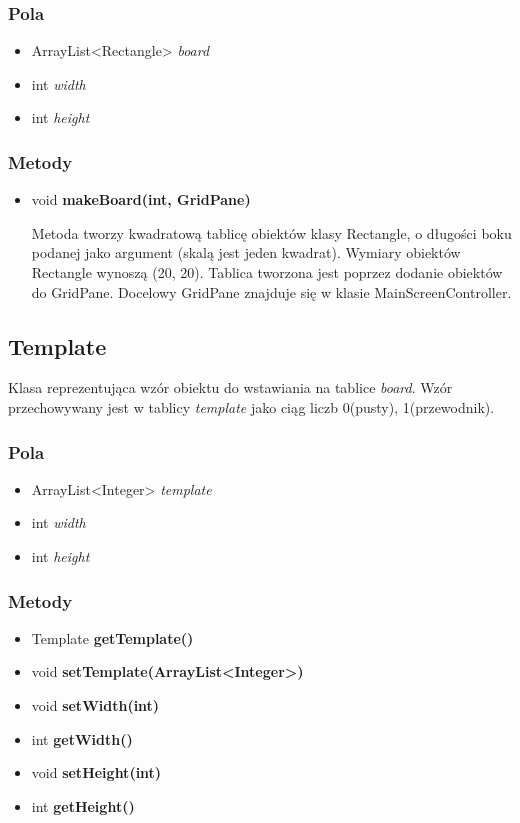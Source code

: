 \documentclass[a4paper,11pt]{article}
\begin{document}
\subsubsection{Pola}
\begin{itemize}
\item ArrayList<Rectangle> \textit{board}
\item int \textit{width}
\item int \textit{height}
\end{itemize}
\subsubsection{Metody}
\begin{itemize}
\item void \textbf{makeBoard(int, GridPane)}

Metoda tworzy kwadratową tablicę obiektów klasy Rectangle, o długości boku podanej jako argument (skalą jest jeden kwadrat). Wymiary obiektów Rectangle wynoszą (20, 20). Tablica tworzona jest poprzez dodanie obiektów do  GridPane. Docelowy GridPane znajduje się w klasie MainScreenController.
\end{itemize}



\subsection{Template}
Klasa reprezentująca wzór obiektu do wstawiania na tablice \textit{board}. Wzór przechowywany jest w tablicy \textit{template} jako ciąg liczb 0(pusty), 1(przewodnik).
\subsubsection{Pola}
\begin{itemize}
\item ArrayList<Integer> \textit{template}
\item int \textit{width}
\item int \textit{height}
\end{itemize}

\subsubsection{Metody}
\begin{itemize}
\item Template \textbf{getTemplate()}
\item void \textbf{setTemplate(ArrayList<Integer>)}
\item void \textbf{setWidth(int)}
\item int \textbf{getWidth()}
\item void \textbf{setHeight(int)}
\item int \textbf{getHeight()}
\end{itemize}
\end{document}
